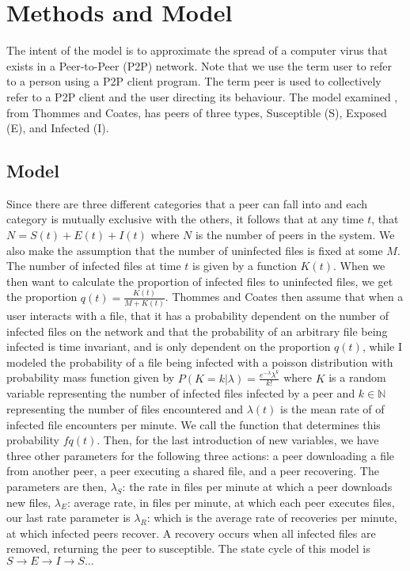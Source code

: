 \documentclass[12pt, oneside]{article}
\begin{document}
    \section{Methods and Model}
    
        The intent of the model is to approximate the spread of a computer virus that exists in a Peer-to-Peer (P2P) network. Note that we use the term user
        to refer to a person using a P2P client program. The term peer is used to collectively refer to a P2P client and the user directing its behaviour.
        The model examined \cite{1689197}, from Thommes and Coates, has peers of three types, Susceptible (S), Exposed (E), and Infected (I). 
    \subsection{Model}
        Since there are three different categories that a peer can fall into and each category is mutually exclusive with the others,
        it follows that at any time $t$, that  $N=S(t)+E(t)+I(t)$ where  $N$ is the number of peers in the system. We also make the assumption that the number of uninfected files is fixed at some $M$.
        The number of infected files at time  $t$ is given by a function  $K(t)$. When we then want to calculate the proportion of infected
        files to uninfected files, we get the proportion  $q(t)=\frac{K(t)}{M+K(t)}$. Thommes and Coates then assume that when a user interacts with a file,
        that it has a probability dependent on the number of infected files on the network and that the probability of an arbitrary file being infected is 
        time invariant, and is only dependent on the proportion $q(t)$, while I modeled the probability of a file being infected with a poisson distribution with
        probability mass function given by $P(K=k | \lambda) = \frac{e^{-\lambda}\lambda^k}{k!}$ where $K$ is a random variable representing the number of infected files
        infected by a peer and $k\in\mathbb{N}$ representing the number of files encountered and $\lambda(t)$ is the mean rate of of infected file encounters per minute.
        We call the function that determines this probability  $f{q(t)}$. Then, for the last introduction of new variables, we have three
        other parameters for the following three actions: a peer downloading a file from another peer, a peer executing a shared file, 
        and a peer recovering. The parameters are then,  $\lambda_S$:  the rate in files per minute at which a peer downloads new files, 
        $\lambda_E$: average rate, in files per minute, at which each peer executes files, our last rate parameter is  $\lambda_R$:
        which is the average rate of recoveries per minute, at which infected peers recover. A recovery occurs when all infected files are
        removed, returning the peer to susceptible. The state cycle of this model is  $S\to E\to I \to S\ldots$\newline
\end{document}
